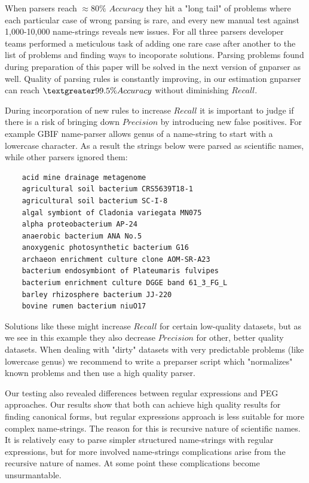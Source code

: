 \documentclass{bmcart}
\begin{document}
When parsers reach $\approx80\%$ $Accuracy$ they hit a "long tail" of problems
where each particular case of wrong parsing is rare, and every new manual test
against 1,000-10,000 name-strings reveals new issues. For all three parsers
developer teams performed a meticulous task of adding one rare case after
another to the list of problems and finding ways to incoporate solutions.
Parsing problems found during preparation of this paper will be solved in the
next version of gnparser as well. Quality of parsing rules is constantly
improving, in our estimation gnparser can reach $\textgreater 99.5\% Accuracy$
without diminishing $Recall$.

During incorporation of new rules to increase $Recall$ it is important to
judge if there is a risk of bringing down $Precision$ by introducing new false
positives.  For example GBIF name-parser allows genus of a name-string to
start with a lowercase character. As a result the strings below were parsed as
scientific names, while other parsers ignored them:


\begin{verbatim}
    acid mine drainage metagenome
    agricultural soil bacterium CRS5639T18-1
    agricultural soil bacterium SC-I-8
    algal symbiont of Cladonia variegata MN075
    alpha proteobacterium AP-24
    anaerobic bacterium ANA No.5
    anoxygenic photosynthetic bacterium G16
    archaeon enrichment culture clone AOM-SR-A23
    bacterium endosymbiont of Plateumaris fulvipes
    bacterium enrichment culture DGGE band 61_3_FG_L
    barley rhizosphere bacterium JJ-220
    bovine rumen bacterium niuO17
\end{verbatim}

Solutions like these might increase $Recall$ for certain low-quality datasets,
but as we see in this example they also decrease $Precision$ for other, better
quality datasets. When dealing with "dirty" datasets with very predictable
problems (like lowercase genus) we recommend to write a preparser script which
"normalizes" known problems and then use a high quality parser.

Our testing also revealed differences between regular expressions and PEG
approaches. Our results show that both can achieve high quality results for
finding canonical forms, but regular expressions approach is less suitable for
more complex name-strings. The reason for this is recursive nature of
scientific names.  It is relatively easy to parse simpler structured
name-strings with regular expressions, but for more involved name-strings
complications arise from the recursive nature of names. At some point these
complications become unsurmantable.
\end{document}
